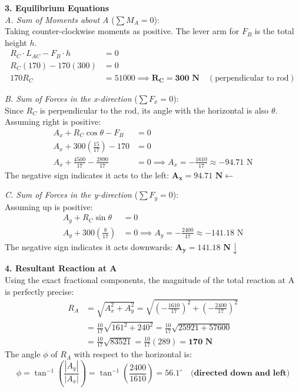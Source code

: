 \documentclass[12pt,a3paper]{article}
\begin{document}
\begin{enumerate}
\begin{tcolorbox}[enhanced,breakable,ansbox,colback=cD!4,colframe=cD,
  boxrule=0.8pt,arc=5pt,
  title={\textbf{Solution}},fonttitle=\bfseries\color{white},
  colbacktitle=cD]
\textbf{3. Equilibrium Equations} \\
\textit{A. Sum of Moments about A} ($\sum M_A = 0$): \\
Taking counter-clockwise moments as positive. The lever arm for $F_B$ is the total height $h$.
\begin{align*}
    R_C \cdot L_{AC} - F_B \cdot h &= 0 \\
    R_C (170) - 170 (300) &= 0 \\
    170 R_C &= 51000 \implies \mathbf{R_C = 300\text{ N}} \quad (\text{perpendicular to rod})
\end{align*}

\textit{B. Sum of Forces in the x-direction} ($\sum F_x = 0$): \\
Since $R_C$ is perpendicular to the rod, its angle with the horizontal is also $\theta$. Assuming right is positive:
\begin{align*}
    A_x + R_C \cos\theta - F_B &= 0 \\
    A_x + 300 \left(\frac{15}{17}\right) - 170 &= 0 \\
    A_x + \frac{4500}{17} - \frac{2890}{17} &= 0 \implies A_x = -\frac{1610}{17} \approx -94.71\text{ N}
\end{align*}
The negative sign indicates it acts to the left: $\mathbf{A_x = 94.71\text{ N} \leftarrow}$

\textit{C. Sum of Forces in the y-direction} ($\sum F_y = 0$): \\
Assuming up is positive:
\begin{align*}
    A_y + R_C \sin\theta &= 0 \\
    A_y + 300 \left(\frac{8}{17}\right) &= 0 \implies A_y = -\frac{2400}{17} \approx -141.18\text{ N}
\end{align*}
The negative sign indicates it acts downwards: $\mathbf{A_y = 141.18\text{ N} \downarrow}$

\textbf{4. Resultant Reaction at A} \\
Using the exact fractional components, the magnitude of the total reaction at A is perfectly precise:
\begin{align*}
    R_A &= \sqrt{A_x^2 + A_y^2} = \sqrt{\left(-\frac{1610}{17}\right)^2 + \left(-\frac{2400}{17}\right)^2} \\
    &= \frac{10}{17} \sqrt{161^2 + 240^2} = \frac{10}{17} \sqrt{25921 + 57600} \\
    &= \frac{10}{17} \sqrt{83521} = \frac{10}{17} (289) = \mathbf{170\text{ N}}
\end{align*}
The angle $\phi$ of $R_A$ with respect to the horizontal is:
\[ \phi = \tan^{-1}\left(\frac{|A_y|}{|A_x|}\right) = \tan^{-1}\left(\frac{2400}{1610}\right) = \mathbf{56.1^\circ \quad \text{(directed down and left)}} \]


\end{tcolorbox}
\end{enumerate}
\end{document}
